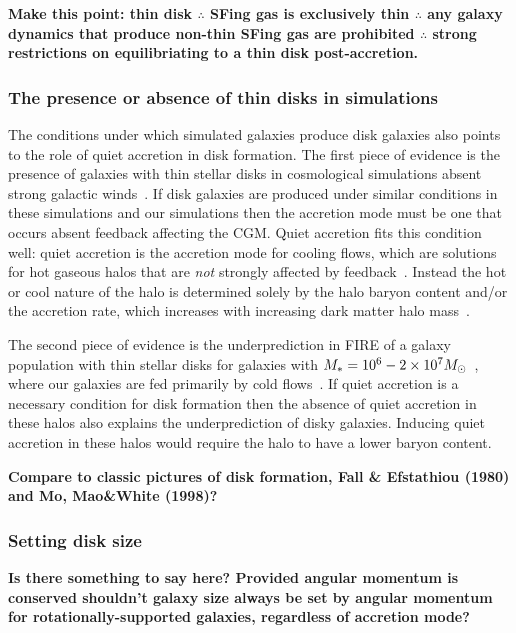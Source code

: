 \documentclass[fleqn,usenatbib]{mnras}
\begin{document}
\textbf{
Make this point:
thin disk $\therefore$
SFing gas is exclusively thin $\therefore$
any galaxy dynamics that produce non-thin SFing gas are prohibited $\therefore$
strong restrictions on equilibriating to a thin disk post-accretion.
}

\subsubsection{The presence or absence of thin disks in simulations}
\label{s: disk formation -- population}

The conditions under which simulated galaxies produce disk galaxies also points to the role of quiet accretion in disk formation.
The first piece of evidence is the presence of galaxies with thin stellar disks in cosmological simulations absent strong galactic winds~\citep{Guedes2011, Bird2013}.
If disk galaxies are produced under similar conditions in these simulations and our simulations then the accretion mode must be one that occurs absent feedback affecting the CGM.
Quiet accretion fits this condition well:
quiet accretion is the accretion mode for cooling flows, which are solutions for hot gaseous halos that are \textit{not} strongly affected by feedback~\citep{Stern2019}.
Instead the hot or cool nature of the halo is determined solely by the halo baryon content and/or the accretion rate, which increases with increasing dark matter halo mass~\citep{Stern2020a}.

The second piece of evidence is the underprediction in FIRE of a galaxy population with thin stellar disks for galaxies with $M_* = 10^6 \-- 2 \times 10^7 M_\odot$~\citep{El-Badry2018a}, where our galaxies are fed primarily by cold flows~\citep{Stern2020}.
If quiet accretion is a necessary condition for disk formation then the absence of quiet accretion in these halos also explains the underprediction of disky galaxies.
Inducing quiet accretion in these halos would require the halo to have a lower baryon content.

\textbf{
Compare to classic pictures of disk formation, Fall \& Efstathiou (1980) and Mo, Mao\&White (1998)?
}

\subsubsection{Setting disk size}
\label{s: disk formation -- disk size}

\textbf{
Is there something to say here?
Provided angular momentum is conserved shouldn't galaxy size always be set by angular momentum for rotationally-supported galaxies, regardless of accretion mode?
}
\end{document}
